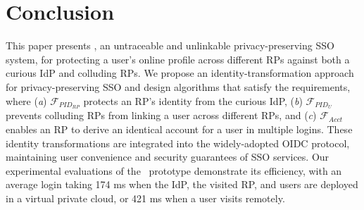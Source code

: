\section{Conclusion}
\label{sec:conclusion}
This paper presents \usso, an untraceable and unlinkable privacy-preserving SSO system,
 for protecting a user's online profile across different RPs against both a curious IdP and colluding RPs.
We propose an identity-transformation approach for privacy-preserving SSO and design algorithms that satisfy the requirements, where (\emph{a}) $\mathcal{F}_{PID_{RP}}$ protects an RP's identity from the curious IdP, (\emph{b}) $\mathcal{F}_{PID_{U}}$ prevents colluding RPs from linking a user across different RPs, and (\emph{c}) $\mathcal{F}_{Acct}$ enables an RP to derive an identical account for a user in multiple logins. These identity transformations are integrated into the widely-adopted OIDC protocol, maintaining user convenience and security guarantees of SSO services. Our experimental evaluations of the \usso\ prototype demonstrate its efficiency, with an average login taking 174 ms when the IdP, the visited RP, and users are deployed in a virtual private cloud, or 421 ms when a user visits remotely.

